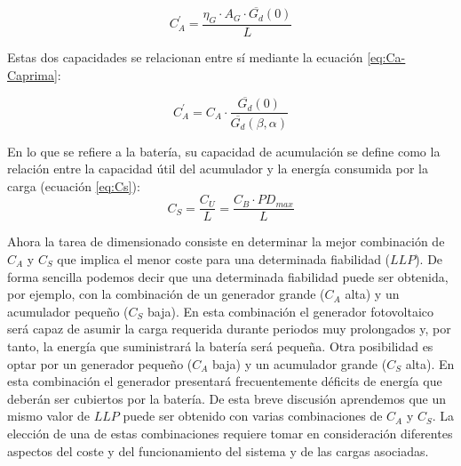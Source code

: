 \begin{equation}
C_{A}^{'}=\frac{\eta_{G}\cdot A_{G}\cdot\overline{G_{d}}(0)}{L}\label{eq:CAPrima}\end{equation}

Estas dos capacidades se relacionan entre sí mediante la ecuación
\ref{eq:Ca-Caprima}:

\begin{equation}
C_{A}^{'}=C_{A}\cdot\frac{\overline{G_{d}}(0)}{\overline{G_{d}}(\beta,\alpha)}\label{eq:Ca-Caprima}\end{equation}

En lo que se refiere a la batería, su capacidad de acumulación se
define como la relación entre la capacidad útil del acumulador y la
energía consumida por la carga (ecuación \ref{eq:Cs}): \begin{equation}
C_{S}=\frac{C_{U}}{L}=\frac{C_{B}\cdot PD_{max}}{L}\label{eq:Cs}\end{equation}

Ahora la tarea de dimensionado consiste en determinar la mejor combinación
de $C_{A}$ y $C_{S}$ que implica el menor coste para una determinada
fiabilidad ($LLP$). De forma sencilla podemos decir que una determinada
fiabilidad puede ser obtenida, por ejemplo, con la combinación de
un generador grande ($C_{A}$ alta) y un acumulador pequeño ($C_{S}$
baja). En esta combinación el generador fotovoltaico será capaz de
asumir la carga requerida durante periodos muy prolongados y, por
tanto, la energía que suministrará la batería será pequeña. Otra posibilidad
es optar por un generador pequeño ($C_{A}$ baja) y un acumulador
grande ($C_{S}$ alta). En esta combinación el generador presentará
frecuentemente déficits de energía que deberán ser cubiertos por la
batería. De esta breve discusión aprendemos que un mismo valor de
$LLP$ puede ser obtenido con varias combinaciones de $C_{A}$ y $C_{S}$.
La elección de una de estas combinaciones requiere tomar en consideración
diferentes aspectos del coste y del funcionamiento del sistema y de
las cargas asociadas.

